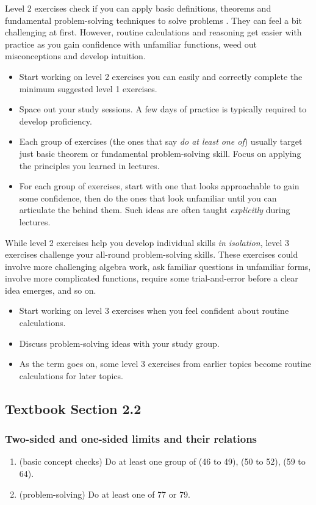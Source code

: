 \documentclass[./main.tex]{subfiles}
\begin{document}
Level 2 exercises check if you can apply basic definitions, theorems and fundamental problem-solving techniques to solve problems . They can feel a bit challenging at first. However, routine calculations and reasoning get easier with practice as you gain confidence with unfamiliar functions, weed out misconceptions and develop intuition. 
\begin{itemize}
  \item Start working on level 2 exercises  you can easily and correctly complete the minimum suggested level 1 exercises.
  \item Space out your study sessions. A few days of practice is typically required to develop proficiency.
  \item Each group of exercises (the ones that say \emph{do at least one of}) usually target just  basic theorem or fundamental problem-solving skill. Focus on applying the principles you learned in lectures. 
  \item For each group of exercises, start with one that looks approachable to gain some confidence, then do the ones that look unfamiliar until you can articulate the  behind them. Such ideas are often taught \emph{explicitly} during lectures.
\end{itemize}

While level 2 exercises help you develop individual skills \emph{in isolation}, level 3 exercises challenge your all-round problem-solving skills. These exercises could involve more challenging algebra work, ask familiar questions in unfamiliar forms, involve more complicated functions, require some trial-and-error before a clear idea emerges, and so on.
\begin{itemize}
  \item Start working on level 3 exercises when you feel confident about routine calculations. 
  \item Discuss problem-solving ideas with your study group. 
  \item As the term goes on, some level 3 exercises from earlier topics become routine calculations for later topics.
\end{itemize}
\clearpage

\subsection*{Textbook Section 2.2} 
\subsubsection{Two-sided and one-sided limits and their relations}
\begin{enumerate}
  \item (basic concept checks) Do at least one group of (46 to 49), (50 to 52), (59 to 64). 
  \item (problem-solving) Do at least one of 77 or 79.
\end{enumerate}
\end{document}
